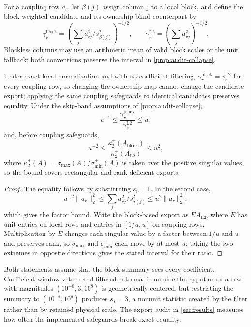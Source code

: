 For a coupling row $a_r$, let $\beta(j)$ assign column $j$ to a local block, and
define the block-weighted candidate and its ownership-blind counterpart by
\[
 \gamma_r^{\mathrm{block}}
 =\left(\sum_j a_{rj}^2/s_{\beta(j)}^2\right)^{-1/2},
 \qquad
 \gamma_r^{\mathrm{L2}}=\left(\sum_j a_{rj}^2\right)^{-1/2}.
\]
Blockless columns may use an arithmetic mean of valid block scales or the unit
fallback; both conventions preserve the interval in \cref{prop:audit-collapse}.

\begin{proposition}
\label{prop:audit-ownership}
Under exact local normalization and with no coefficient filtering,
$\gamma_r^{\mathrm{block}}=\gamma_r^{\mathrm{L2}}$ for every coupling row, so
changing the ownership map cannot change the candidate export; applying the same
coupling safeguards to identical candidates preserves equality.
Under the skip-band assumptions of \cref{prop:audit-collapse},
\[
 u^{-1}\leq\frac{\gamma_r^{\mathrm{block}}}
                       {\gamma_r^{\mathrm{L2}}}\leq u,
\]
and, before coupling safeguards,
\[
 u^{-2}\leq\frac{\kappa_2^+(A_{\mathrm{block}})}{\kappa_2^+(A_{\mathrm{L2}})}\leq u^2,
\]
where $\kappa_2^+(A)=\sigma_{\max}(A)/\sigma_{\min}^+(A)$ is taken over the positive singular
values, so the bound covers rectangular and rank-deficient exports.
\end{proposition}
\begin{proof}
The equality follows by substituting $s_i=1$. In the second case,
\[
 u^{-2}\|a_r\|_2^2\leq\sum_j a_{rj}^2/s_{\beta(j)}^2
 \leq u^2\|a_r\|_2^2,
\]
which gives the factor bound. Write the block-based export as $EA_{\mathrm{L2}}$,
where $E$ has unit entries on local rows and entries in $[1/u,u]$ on coupling
rows. Multiplication by $E$ changes each singular value by a factor between
$1/u$ and $u$ and preserves rank, so $\sigma_{\max}$ and $\sigma_{\min}^+$ each move by at
most $u$; taking the two extremes in opposite directions gives the stated interval for their
ratio.
\end{proof}

Both statements assume that the block summary sees every coefficient. Coefficient-window
vetoes and filtered extrema lie outside the hypotheses: a row with magnitudes
$(10^{-8},3,10^8)$ is geometrically centered, but restricting the summary to
$(10^{-6},10^6)$ produces $s_I=3$, a nonunit statistic created by the filter rather than by
retained physical scale. The export audit in \cref{sec:results} measures how often the
implemented safeguards break exact equality.

